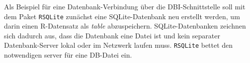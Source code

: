 %
%
%
%
%

Als Beispiel für eine Datenbank-Verbindung über die DBI-Schnittstelle soll mit dem Paket \lstinline!RSQLite! \cite{James2013a} zunächst eine SQLite-Datenbank neu erstellt werden, um darin einen R-Datensatz als \emph{table} abzuspeichern. SQLite-Datenbanken zeichnen sich dadurch aus, dass die Datenbank eine Datei ist und kein separater Datenbank-Server lokal oder im Netzwerk laufen muss. \lstinline!RSQLite! bettet den notwendigen server für eine DB-Datei ein.

